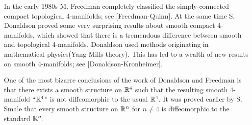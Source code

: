 \begin{remark}
  In the early 1980s M. Freedman completely classified the simply-connected compact 
  topological 4-manifolds; see [Freedman-Quinn]\supercite{Freedman-Quinn}. At the same time S. Donaldson proved 
  some very surprising results about smooth compact 4-manifolds, which showed that there 
  is a tremendous difference between smooth and topological 4-manifolds. Donaldson used 
  methods originating in mathematical physics(Yang-Mills theory). This has led to a wealth of 
  new results on smooth 4-manifolds; see [Donaldson-Kronheimer]\supercite{Donaldson-Kronheimer}.

  One of the most bizarre conclusions of the work of Donaldson and Freedman is
  that there exists a smooth structure on ${\mathbb{R}}^4$ such that the resulting smooth 4-manifold
  ``${\mathbb{R}}^4$'' is not diffeomorphic to the usual ${\mathbb{R}}^4$. It was proved earlier by S. Smale that
  every smooth structure on ${\mathbb{R}}^n$ for $n\neq 4$ is diffeomorphic to the standard ${\mathbb{R}}^n$.
\end{remark}